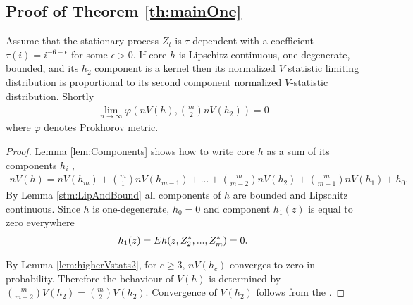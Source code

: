 \subsection{Proof of Theorem  \ref{th:mainOne}} 
 \label{sec:prMainOne}
 
\begin{lemma}
\label{lem:equivVanila}
Assume that the stationary process $Z_t$ is $\tau$-dependent with a coefficient $\tau(i) = i^{-6-\epsilon}$ for some $\epsilon>0$. If core $h$ is Lipschitz continuous, one-degenerate, bounded, and its $h_2$ component is a kernel then its normalized $V$ statistic limiting distribution is proportional to its second component normalized $V$-statistic distribution. Shortly    
\begin{align}
\lim_{n \to \infty} \varphi( n V(h), \binom m 2  n V(h_2) ) = 0
\end{align}
where $\varphi$ denotes Prokhorov metric. 
\end{lemma}
\begin{proof}
Lemma \ref{lem:Components} shows how to write core  $h$ as a sum of its components $h_i$ ,
\begin{align}
  n V(h) = n V(h_m) + \binom m 1 n V(h_{m-1}) + ...+ \binom {m} {m-2} n V(h_{2}) + \binom {m} {m-1} n V(h_{1})+h_0.
\end{align}
By Lemma \ref{stm:LipAndBound} all components of $h$ are bounded and Lipschitz continuous. Since $h$ is one-degenerate, $h_0=0$ and component $h_1(z)$ is equal to zero everywhere
\begin{align}
h_1(z) = E h(z,Z_{2}^*,...,Z_{m}^*)=0. 
\end{align}

By Lemma \ref{lem:higherVstats2}, for $c \geq 3$, $n V(h_{c})$  converges to zero in probability. Therefore the behaviour of $V(h)$ is determined by $\binom {m} {m-2} V(h_2) = \binom {m} {2} V(h_2)$. Convergence of $V(h_2)$ follows from the \cite[Theorem 2.1]{leucht_dependent_2013}.
\end{proof}




